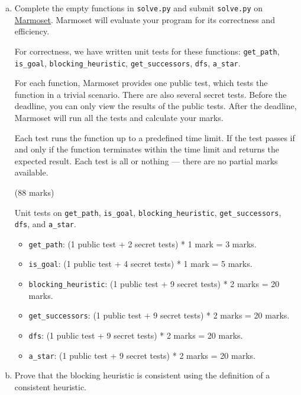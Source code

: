 \documentclass[12pt]{article}
\begin{document}
\begin{enumerate}[(a)]

\item Complete the empty functions in \verb+solve.py+ and submit \verb+solve.py+ on \href{https://marmoset.student.cs.uwaterloo.ca/}{Marmoset}. Marmoset will evaluate your program for its correctness and efficiency.

For correctness, we have written unit tests for these functions: \verb+get_path+, \verb+is_goal+, \verb+blocking_heuristic+, \verb+get_successors+, \verb+dfs+, \verb+a_star+.

For each function, Marmoset provides one public test, which tests the function in a trivial scenario. There are also several secret tests. Before the deadline, you can only view the results of the public tests. After the deadline, Marmoset will run all the tests and calculate your marks.

Each test runs the function up to a predefined time limit. If the test passes if and only if the function terminates within the time limit and returns the expected result. Each test is all or nothing --- there are no partial marks available.

\begin{markscheme}
(88 marks) 

Unit tests on \verb+get_path+, \verb+is_goal+, \verb+blocking_heuristic+, \verb+get_successors+, \verb+dfs+, and \verb+a_star+. 

\begin{itemize}
\item \verb+get_path+: (1 public test + 2 secret tests) * 1 mark = 3 marks.
\item \verb+is_goal+:  (1 public test + 4 secret tests) * 1 mark = 5 marks.
\item \verb+blocking_heuristic+: (1 public test + 9 secret tests) * 2 marks = 20 marks.
\item \verb+get_successors+: (1 public test + 9 secret tests) * 2 marks = 20 marks.
\item \verb+dfs+:    (1 public test + 9 secret tests) * 2 marks = 20 marks.
\item \verb+a_star+: (1 public test + 9 secret tests) * 2 marks = 20 marks.
\end{itemize}

\end{markscheme}
  
\item Prove that the blocking heuristic is consistent using the definition of a consistent heuristic. 


\end{enumerate}
\end{document}
